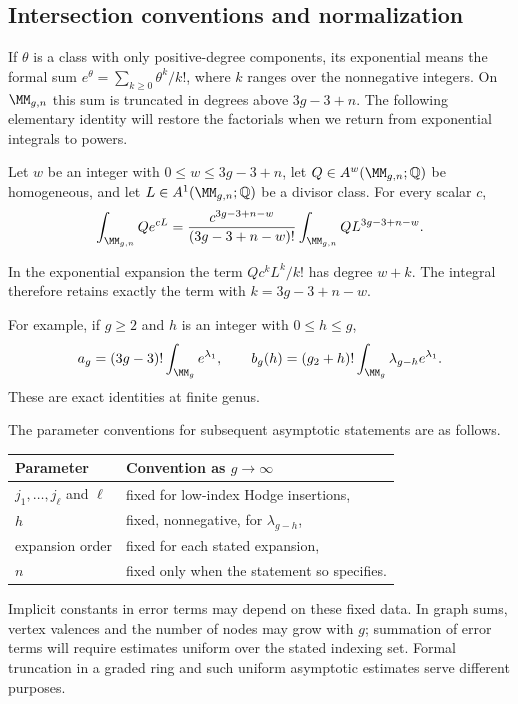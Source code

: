 \subsection{Intersection conventions and normalization}
\label{subsec:s02:01}

If $\theta$ is a class with only positive-degree components, its
exponential means the formal sum
$e^\theta=\sum_{k\geq0}\theta^k/k!$, where $k$ ranges over the
nonnegative integers.  On $\MM_{g,n}$ this sum is truncated in degrees
above $3g-3+n$.  The following elementary identity will restore the
factorials when we return from exponential integrals to powers.

\begin{lmm}
\label{lmm:s02:exp-to-power}
Let $w$ be an integer with $0\leq w\leq3g-3+n$, let
$Q\in A^w(\MM_{g,n};\mathbb Q)$ be homogeneous, and let
$L\in A^1(\MM_{g,n};\mathbb Q)$ be a divisor class.  For every scalar
$c$,
\begin{equation}
\label{eq:s02:exp-to-power}
\int_{\MM_{g,n}}Qe^{cL}
=\frac{c^{3g-3+n-w}}{(3g-3+n-w)!}
  \int_{\MM_{g,n}}QL^{3g-3+n-w}.
\end{equation}
\end{lmm}

\begin{prf}
In the exponential expansion the term $Qc^kL^k/k!$ has degree $w+k$.
The integral therefore retains exactly the term with
$k=3g-3+n-w$.
\end{prf}

For example, if $g\geq2$ and $h$ is an integer with $0\leq h\leq g$,
\begin{equation}
\label{eq:s02:hodge-factorials}
a_g=(3g-3)!\int_{\MM_g}e^{\lambda_1},
\qquad
b_g(h)=(g_2+h)!\int_{\MM_g}\lambda_{g-h}e^{\lambda_1}.
\end{equation}
These are exact identities at finite genus.

The parameter conventions for subsequent asymptotic statements are as
follows.
\begin{center}
\begin{tabular}{ll}
Parameter & Convention as $g\to\infty$ \\
\hline
$j_1,\ldots,j_\ell$ and $\ell$ & fixed for low-index Hodge insertions, \\
$h$ & fixed, nonnegative, for $\lambda_{g-h}$, \\
expansion order & fixed for each stated expansion, \\
$n$ & fixed only when the statement so specifies.
\end{tabular}
\end{center}
Implicit constants in error terms may depend on these fixed data.
In graph sums, vertex valences and the number of nodes may grow with
$g$; summation of error terms will require estimates uniform over the
stated indexing set.  Formal truncation in a graded ring and such
uniform asymptotic estimates serve different purposes.
